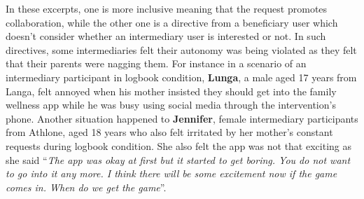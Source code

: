 \documentclass{sig-alternate}
\begin{document}
In these excerpts, one is more inclusive meaning that the request promotes collaboration, while the other one is a directive from a beneficiary user which doesn't consider whether an intermediary user is interested or not. In such directives, some intermediaries felt their autonomy was being violated as they felt that their parents were nagging them. For instance in a scenario of an intermediary participant in logbook condition, \textbf{Lunga}, a male aged 17 years from Langa, felt annoyed when his mother insisted they should get into the family wellness app while he was busy using social media through the intervention's phone. Another situation happened to \textbf{Jennifer}, female intermediary participants from Athlone, aged 18 years who also felt irritated by her mother's constant requests during logbook condition. She also felt the app was not that exciting as she said ``\emph{The app was okay at first but it started to get boring. You do not want to go into it any more. I think there will be some excitement now if the game comes in. When do we get the game}''. 
\end{document}
